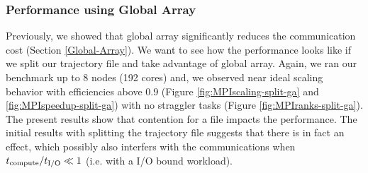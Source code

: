 \subsubsection*{Performance using Global Array}
Previously, we showed that global array significantly reduces the communication cost (Section \ref{Global-Array}). 
We want to see how the performance looks like if we split our trajectory file and take advantage of global array.
Again, we ran our benchmark up to 8 nodes (192 cores) and, we observed near ideal scaling behavior with efficiencies above 0.9 (Figure \ref{fig:MPIscaling-split-ga} and \ref{fig:MPIspeedup-split-ga}) with no straggler tasks (Figure \ref{fig:MPIranks-split-ga}).  
The present results show that contention for a file impacts the performance. 
The initial results with splitting the trajectory file suggests that there is in fact an effect, which possibly also interfers with the communications when ${t}_{\text{compute}}/{t}_{\text{I/O}} \ll 1$ (i.e. with a I/O bound workload).

